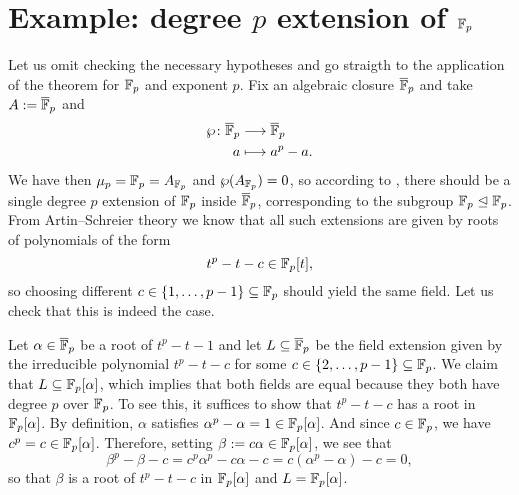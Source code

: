 \documentclass[12pt]{amsart}
\begin{document}
\section{Example: degree $p$ extension of $\mathbb{F}_{p}$}

Let us omit checking the necessary hypotheses and go straigth to the application of the theorem for $\mathbb{F}_{p}$ and exponent $p$.
Fix an algebraic closure $\overline{\mathbb{F}}_{p}$ and take $A:=\overline{\mathbb{F}}_{p}$ and
\begin{align*}
    \wp\colon \overline{\mathbb{F}}_{p} & \longrightarrow \overline{\mathbb{F}}_{p} \\
    a & \longmapsto a^{p}-a.
\end{align*}
We have then $\mu_{p}=\mathbb{F}_{p}=A_{\mathbb{F}_{p}}$ and $\wp(A_{\mathbb{F}_{p}})=0$, so according to , there should be a single degree $p$ extension of $\mathbb{F}_{p}$ inside $\overline{\mathbb{F}}_{p}$, corresponding to the subgroup $\mathbb{F}_{p}\trianglelefteq \mathbb{F}_{p}$.
From Artin--Schreier theory we know that all such extensions are given by roots of polynomials of the form
\[ t^{p}-t-c \in \mathbb{F}_{p}[t], \]
so choosing different $c\in \{ 1,\ldots,p-1\}\subseteq \mathbb{F}_{p}$ should yield the same field.
Let us check that this is indeed the case.

Let $\alpha\in \overline{\mathbb{F}}_{p}$ be a root of $t^{p}-t-1$ and let $L\subseteq \overline{\mathbb{F}}_{p}$ be the field extension given by the irreducible polynomial $t^{p}-t-c$ for some $c\in \{2,\ldots,p-1\}\subseteq \mathbb{F}_{p}$.
We claim that $L\subseteq \mathbb{F}_{p}[\alpha]$, which implies that both fields are equal because they both have degree $p$ over $\mathbb{F}_{p}$.
To see this, it suffices to show that $t^{p}-t-c$ has a root in $\mathbb{F}_{p}[\alpha]$.
By definition, $\alpha$ satisfies $\alpha^{p}-\alpha=1\in \mathbb{F}_{p}[\alpha]$.
And since $c\in \mathbb{F}_{p}$, we have $c^{p}=c\in \mathbb{F}_{p}[\alpha]$.
Therefore, setting $\beta:=c\alpha\in \mathbb{F}_{p}[\alpha]$, we see that
\[ \beta^{p}-\beta-c=c^{p}\alpha^{p}-c\alpha-c=c(\alpha^{p}-\alpha)-c=0, \]
so that $\beta$ is a root of $t^{p}-t-c$ in $\mathbb{F}_{p}[\alpha]$ and $L=\mathbb{F}_{p}[\alpha]$.





\vfill
\end{document}
